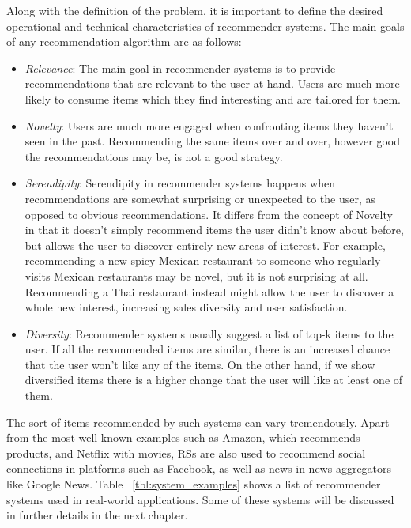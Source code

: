 \documentclass[cic,tc,english]{iiufrgs}
\begin{document}
Along with the definition of the problem, it is important to define the desired operational and technical characteristics of recommender systems. The main goals of any recommendation algorithm are as follows:
\begin{itemize}
\item \emph{Relevance}: The main goal in recommender systems is to provide recommendations that are relevant to the user at hand. Users are much more likely to consume items which they find interesting and are tailored for them.
\item \emph{Novelty}: Users are much more engaged when confronting items they haven't seen in the past. Recommending the same items over and over, however good the recommendations may be, is not a good strategy.
\item \emph{Serendipity}: Serendipity in recommender systems happens when recommendations are somewhat surprising or unexpected to the user, as opposed to obvious recommendations. It differs from the concept of Novelty in that it doesn't simply recommend items the user didn't know about before, but allows the user to discover entirely new areas of interest. For example, recommending a new spicy Mexican restaurant to someone who regularly visits Mexican restaurants may be novel, but it is not surprising at all. Recommending a Thai restaurant instead might allow the user to discover a whole new interest, increasing sales diversity and user satisfaction.
\item \emph{Diversity}: Recommender systems usually suggest a list of top-k items to the user. If all the recommended items are similar, there is an increased chance that the user won't like any of the items. On the other hand, if we show diversified items there is a higher change that the user will like at least one of them.
\end{itemize}

The sort of items recommended by such systems can vary tremendously. Apart from the most well known examples such as Amazon, which recommends products, and Netflix with movies, RSs are also used to recommend social connections in platforms such as Facebook, as well as news in news aggregators like Google News. Table  ~\ref{tbl:system_examples} shows a list of recommender systems used in real-world applications. Some of these systems will be discussed in further details in the next chapter.
\end{document}
